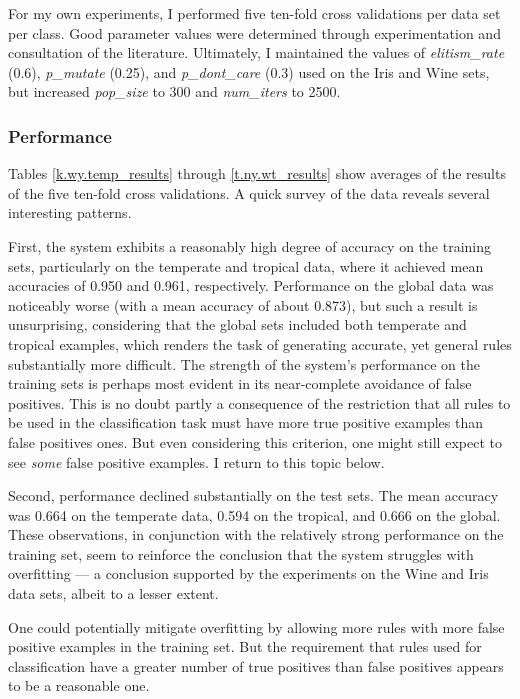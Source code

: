 \documentclass[12pt]{article}
\begin{document}
For my own experiments, I performed five ten-fold cross validations per data set per class. Good parameter values were determined through experimentation and consultation of the literature. Ultimately, I maintained the values of \textit{elitism\_rate} (0.6), \textit{p\_mutate} (0.25), and \textit{p\_dont\_care} (0.3) used on the Iris and Wine sets, but increased \textit{pop\_size} to 300 and \textit{num\_iters} to 2500.

\subsubsection{Performance}

Tables \ref{k.wy.temp_results} through \ref{t.ny.wt_results} show averages of the results of the five ten-fold cross validations. A quick survey of the data reveals several interesting patterns.

First, the system exhibits a reasonably high degree of accuracy on the training sets, particularly on the temperate and tropical data, where it achieved mean accuracies of 0.950 and 0.961, respectively. Performance on the global data was noticeably worse (with a mean accuracy of about 0.873), but such a result is unsurprising, considering that the global sets included both temperate and tropical examples, which renders the task of generating accurate, yet general rules substantially more difficult. The strength of the system's performance on the training sets is perhaps most evident in its near-complete avoidance of false positives. This is no doubt partly a consequence of the restriction that all rules to be used in the classification task must have more true positive examples than false positives ones. But even considering this criterion, one might still expect to see \emph{some} false positive examples. I return to this topic below.

Second, performance declined substantially on the test sets. The mean accuracy was 0.664 on the temperate data, 0.594 on the tropical, and 0.666 on the global. These observations, in conjunction with the relatively strong performance on the training set, seem to reinforce the conclusion that the system struggles with overfitting --- a conclusion supported by the experiments on the Wine and Iris data sets, albeit to a lesser extent.

One could potentially mitigate overfitting by allowing more rules with more false positive examples in the training set. But the requirement that rules used for classification have a greater number of true positives than false positives appears to be a reasonable one. 
\end{document}
